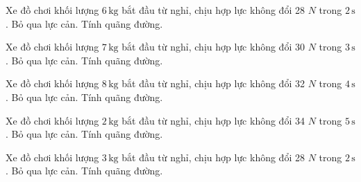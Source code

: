 \begin{bt}
Xe đồ chơi khối lượng $6\,\text{kg}$ bắt đầu từ nghỉ, chịu hợp lực không đổi 28 $N$ trong $2\,\text{s}$. Bỏ qua lực cản. Tính quãng đường.
\end{bt}

\begin{bt}
Xe đồ chơi khối lượng $7\,\text{kg}$ bắt đầu từ nghỉ, chịu hợp lực không đổi 30 $N$ trong $3\,\text{s}$. Bỏ qua lực cản. Tính quãng đường.
\end{bt}

\begin{bt}
Xe đồ chơi khối lượng $8\,\text{kg}$ bắt đầu từ nghỉ, chịu hợp lực không đổi 32 $N$ trong $4\,\text{s}$. Bỏ qua lực cản. Tính quãng đường.
\end{bt}

\begin{bt}
Xe đồ chơi khối lượng $2\,\text{kg}$ bắt đầu từ nghỉ, chịu hợp lực không đổi 34 $N$ trong $5\,\text{s}$. Bỏ qua lực cản. Tính quãng đường.
\end{bt}

\begin{bt}
Xe đồ chơi khối lượng $3\,\text{kg}$ bắt đầu từ nghỉ, chịu hợp lực không đổi 28 $N$ trong $2\,\text{s}$. Bỏ qua lực cản. Tính quãng đường.
\end{bt}
